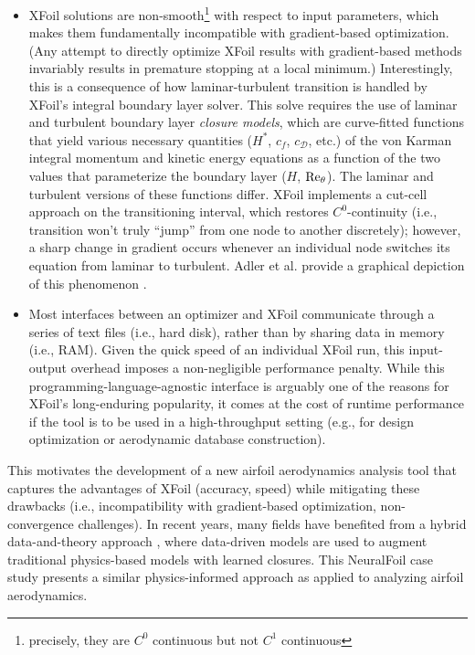 \begin{itemize}
        \item XFoil solutions are non-smooth\footnote{precisely, they are $C^0$ continuous but not $C^1$ continuous} with respect to input parameters, which makes them fundamentally incompatible with gradient-based optimization. (Any attempt to directly optimize XFoil results with gradient-based methods invariably results in premature stopping at a local minimum.) Interestingly, this is a consequence of how laminar-turbulent transition is handled by XFoil's integral boundary layer solver. This solve requires the use of laminar and turbulent boundary layer \emph{closure models}, which are curve-fitted functions that yield various necessary quantities ($H^*$, $c_f$, $c_\mathcal{D}$, etc.) of the von Karman integral momentum and kinetic energy equations as a function of the two values that parameterize the boundary layer ($H$, $\rm Re_\theta$). The laminar and turbulent versions of these functions differ. XFoil implements a cut-cell approach on the transitioning interval, which restores $C^0$-continuity (i.e., transition won't truly ``jump'' from one node to another discretely); however, a sharp change in gradient occurs whenever an individual node switches its equation from laminar to turbulent. Adler et al. provide a graphical depiction of this phenomenon \cite{adler_cfd_2022}.
        \item Most interfaces between an optimizer and XFoil communicate through a series of text files (i.e., hard disk), rather than by sharing data in memory (i.e., RAM). Given the quick speed of an individual XFoil run, this input-output overhead imposes a non-negligible performance penalty. While this programming-language-agnostic interface is arguably one of the reasons for XFoil's long-enduring popularity, it comes at the cost of runtime performance if the tool is to be used in a high-throughput setting (e.g., for design optimization or aerodynamic database construction).
    \end{itemize}

    This motivates the development of a new airfoil aerodynamics analysis tool that captures the advantages of XFoil (accuracy, speed) while mitigating these drawbacks (i.e., incompatibility with gradient-based optimization, non-convergence challenges). In recent years, many fields have benefited from a hybrid data-and-theory approach \cite{brunton_data_2017}, where data-driven models are used to augment traditional physics-based models with learned closures. This NeuralFoil case study presents a similar physics-informed approach as applied to analyzing airfoil aerodynamics.

